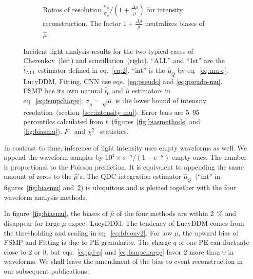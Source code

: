 \begin{figure}[H]
  \vspace{0.5em}
  \begin{subfigure}[b]{\textwidth}
    \centering
    \resizebox{0.99\textwidth}{!}{}
    \vspace{-0.5em}
    \caption{\label{fig:deltamu} Ratios of resolution $\frac{\sigma_{\hat{\mu}}}{\underline{\sigma}_\mu}/\left(1 + \frac{\overline{\Delta \mu}}{\mu}\right)$ for intensity reconstruction.  The factor $1 + \frac{\overline{\Delta \mu}}{\mu}$ neutralizes biases of $\hat{\mu}$.}
  \end{subfigure}
  \caption{Incident light analysis results for the two typical cases of Cherenkov~(left) and scintillation~(right).  ``ALL'' and ``1st'' are the $\hat{t}_\mathrm{ALL}$ estimator defined in eq.~\eqref{eq:2}. ``int'' is the $\hat{\mu}_Q$ by eq.~\eqref{eq:mu-q}.  LucyDDM, Fitting, CNN use eqs.~\eqref{eq:pseudo} and \eqref{eq:pseudo-mu}.  FSMP has its own natural $\hat{t}_0$ and $\hat{\mu}$ estimators in eq.~\eqref{eq:fsmpcharge}. $\underline{\sigma}_\mu = \sqrt{\mu}$ is the lower bound of intensity resolution~(section~\ref{sec:intensity-mu}). Error bars are 5--95 percentiles calculated from $t$~(figures~\ref{fig:biasmethods} and \ref{fig:biasmu}), $F$~ and $\chi^2$~ statistics.}
\end{figure}

In contrast to time, inference of light intensity uses empty waveforms as well.  We append the waveform samples by $10^4 \times e^{-\mu} / (1-e^{-\mu})$ empty ones.  The number is proportional to the Poisson prediction.  It is equivalent to appending the same amount of zeros to the $\hat{\mu}$'s. The QDC integration estimator $\hat{\mu}_Q$~(``int'' in figures~\ref{fig:biasmu} and~\ref{fig:deltamu}) is ubiquitous and is plotted together with the four waveform analysis methods.

In figure~\ref{fig:biasmu}, the biases of $\hat{\mu}$ of the four methods are within \SI{2}{\percent} and disappear for large $\mu$ expect LucyDDM.  The tendency of LucyDDM comes from the thresholding and scaling in eq.~\eqref{eq:fdconv2}.  For low $\mu$, the upward bias of FSMP and Fitting is due to PE granularity.  The charge $q$ of one PE can fluctuate close to 2 or 0, but eqs.~\eqref{eq:gd-q} and \eqref{eq:fsmpcharge} favor 2 more than 0 in waveforms.  We shall leave the amendment of the bias to event reconstruction in our subsequent publications.

